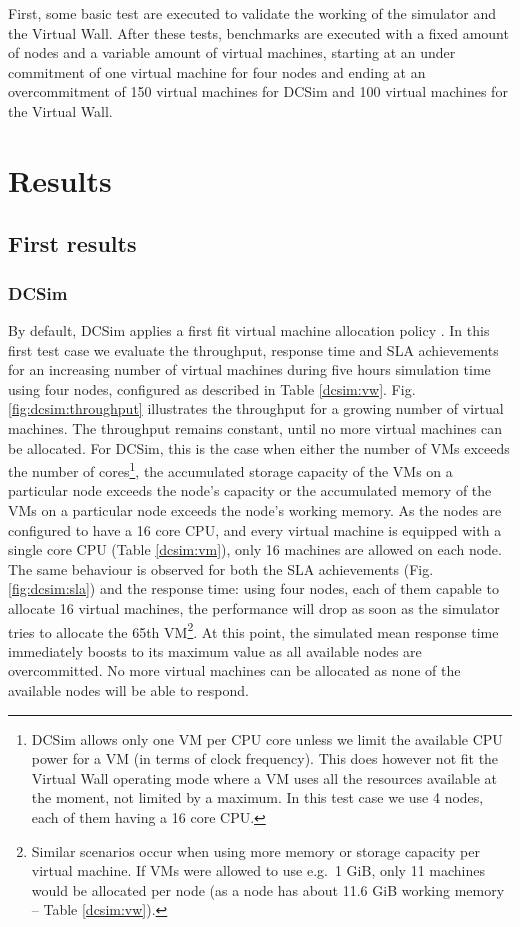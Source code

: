 \documentclass[conference, 10pt]{IEEEtran}
\begin{document}
First, some basic test are executed to validate the working of the simulator and the Virtual Wall. After these tests, benchmarks are executed with a fixed amount of nodes and a variable amount of virtual machines, starting at an under commitment of one virtual machine for four nodes and ending at an overcommitment of 150 virtual machines for DCSim and 100 virtual machines for the Virtual Wall.


\section{Results}
\label{sec:results}

\subsection{First results}
\subsubsection{DCSim} 
By default, DCSim applies a first fit virtual machine allocation policy \cite{firstfit}. In this first test case we evaluate the throughput, response time and SLA achievements for an increasing number of virtual machines during five hours simulation time using four nodes, configured as described in Table \ref{dcsim:vw}. Fig.\xspace\ref{fig:dcsim:throughput} illustrates the throughput for a growing number of virtual machines. The throughput remains constant, until no more virtual machines can be allocated. For DCSim, this is the case when either the number of VMs exceeds the number of cores\footnote{DCSim allows only one VM per CPU core unless we limit the available CPU power for a VM (in terms of clock frequency). This does however not fit the Virtual Wall operating mode where a VM uses all the resources available at the moment, not limited by a maximum. In this test case we use 4 nodes, each of them having a 16 core CPU.}, the accumulated storage capacity of the VMs on a particular node exceeds the node's capacity or the accumulated memory of the VMs on a particular node exceeds the node's working memory. As the nodes are configured to have a 16 core CPU, and every virtual machine is equipped with a single core CPU (Table \ref{dcsim:vm}), only 16 machines are allowed on each node.  The same behaviour is observed for both the SLA achievements (Fig.\xspace\ref{fig:dcsim:sla}) and the response time: using four nodes, each of them capable to allocate 16 virtual machines, the performance will drop as soon as the simulator tries to allocate the 65th VM\footnote{Similar scenarios occur when using more memory or storage capacity per virtual machine. If VMs were allowed to use e.g.~1 GiB, only 11 machines would be allocated per node (as a node has about 11.6 GiB working memory -- Table \ref{dcsim:vw}).}. At this point, the simulated mean response time immediately boosts to its maximum value as all available nodes are overcommitted. No more virtual machines can be allocated as none of the available nodes will be able to respond.
\end{document}
